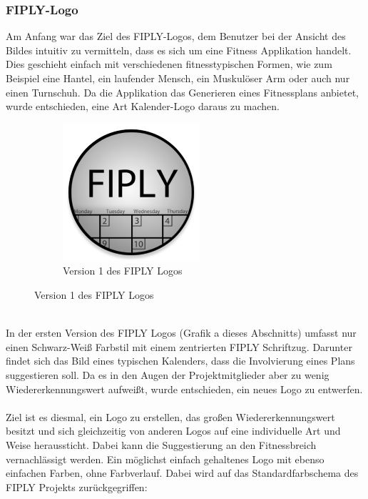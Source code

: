 \documentclass[FIPLY_base.tex]{subfiles}
\begin{document}
	\subsubsection{FIPLY-Logo} 
	Am Anfang war das Ziel des FIPLY-Logos, dem Benutzer bei der Ansicht des Bildes intuitiv zu vermitteln, dass es sich um eine Fitness Applikation handelt. Dies geschieht einfach mit verschiedenen fitnesstypischen Formen, wie zum Beispiel eine Hantel, ein laufender Mensch, ein Muskulöser Arm oder auch nur einen Turnschuh. Da die Applikation das Generieren eines Fitnessplans anbietet, wurde entschieden, eine Art Kalender-Logo daraus zu machen. 
	\begin{figure}[H]
		\begin{subfigure}[b]{1\textwidth}
			\centering
			\includegraphics[scale=1]{img/icons/Version1}
			\centering
			\caption{Version 1 des FIPLY Logos}
		\end{subfigure}
	\end{figure}
	\ \\
	In der ersten Version des FIPLY Logos (Grafik a dieses Abschnitts) umfasst nur einen Schwarz-Weiß Farbstil mit einem zentrierten \grqq{}FIPLY\grqq{} Schriftzug. Darunter findet sich das Bild eines typischen Kalenders, dass die Involvierung eines Plans suggestieren soll. Da es in den Augen der Projektmitglieder aber zu wenig Wiedererkennungswert aufweißt, wurde entschieden, ein neues Logo zu entwerfen. 
	\ \\
	Ziel ist es diesmal, ein Logo zu erstellen, das großen Wiedererkennungswert besitzt und sich gleichzeitig von anderen Logos auf eine individuelle Art und Weise heraussticht. Dabei kann die Suggestierung an den Fitnessbreich vernachlässigt werden. Ein möglichst einfach gehaltenes Logo mit ebenso einfachen Farben, ohne Farbverlauf. Dabei wird auf das Standardfarbschema des FIPLY Projekts zurückgegriffen:
\end{document}
